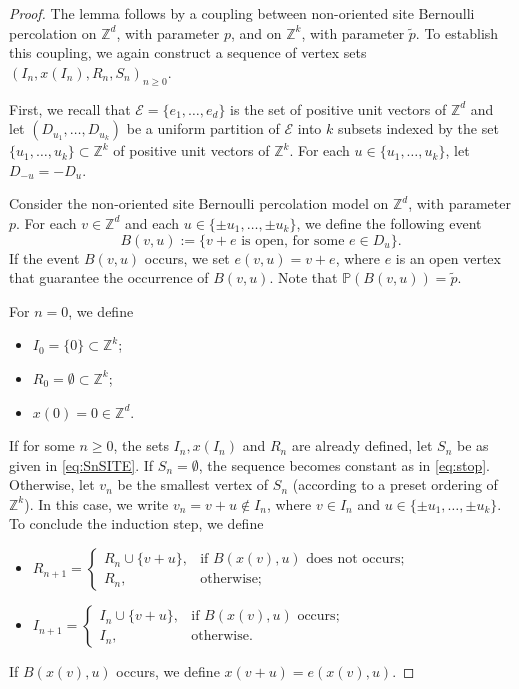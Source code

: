\documentclass{aptpub}
\newcommand{\Z}{\mathbb{Z}}
\newcommand{\Pp}{\mathbb{P}}
\newcommand{\Ee}{\mathcal{E}}
\begin{document}
\begin{proof}
The lemma follows by a coupling between non-oriented site Bernoulli percolation on $\Z^d$, with parameter $p$, and on $\Z^{k}$, with parameter $\tilde{p}$. To establish this coupling, we again construct a sequence of vertex sets $(I_n, x(I_n), R_n, S_n)_{n \geq 0}$.  

First, we recall that $\Ee = \{e_1, \dots, e_d\}$ is the set of positive unit vectors of $\Z^d$ and let $(D_{u_1}, \dots, D_{u_k})$ be a uniform partition of $\Ee$ into $k$ subsets indexed by the set $\{u_1, \dots, u_k \}\subset\Z^k$ of positive unit vectors of $\Z^k$. For each $u \in \{u_1, \dots, u_k \} $, let $D_{-u} = -D_u$.

Consider the non-oriented site Bernoulli percolation model on $\Z^d$, with parameter $p$. For each $v \in \Z^d$ and each $u \in \{\pm u_1, \dots, \pm u_k\}$, we define the following event
\begin{equation*}
    B(v,u) := \{ v+e \text{ is open, for some } e \in D_u \}.
\end{equation*}
If the event $B(v,u)$ occurs, we set $e(v,u) = v+e$, where $e$ is an open vertex that guarantee the occurrence of $B(v,u)$. Note that  $\Pp(B(v,u)) = \tilde{p}.$

For $n = 0$, we define 
\begin{itemize}
    \item $I_0 = \{0\} \subset \Z^k$;
    \item $R_0 = \emptyset \subset \Z^k$;
    \item $x(0) = 0 \in \Z^d$.
\end{itemize}
If for some $n \geq 0$, the sets $I_n, x(I_n)$ and $R_n$ are already defined, let $S_n$ be as given in \eqref{eq:SnSITE}. If $S_n = \emptyset$, the sequence becomes constant as in \eqref{eq:stop}. Otherwise, let $v_n$ be the smallest vertex of $S_n$ (according to a preset ordering of $\Z^k$). In this case, we write $v_n = v+u \notin I_n$, where $v \in I_n$ and $u \in \{\pm u_1, \dots, \pm u_k\}$. To conclude the induction step, we define
\begin{itemize}
    \item $R_{n+1} = 
    \begin{cases} R_n \cup \{v+u\}, &\text{if } B(x(v),u) \text{ does not occurs};\\
                  R_n, & \text{otherwise};
    \end{cases}$
    \item $I_{n+1} = 
    \begin{cases} I_n \cup \{v+u\}, &\text{if } B(x(v),u) \text{ occurs};\\
                  I_n, & \text{otherwise}.
    \end{cases}$
\end{itemize}
If $B(x(v),u)$ occurs, we define $x(v+u) = e(x(v),u)$.


\end{proof}
\end{document}

